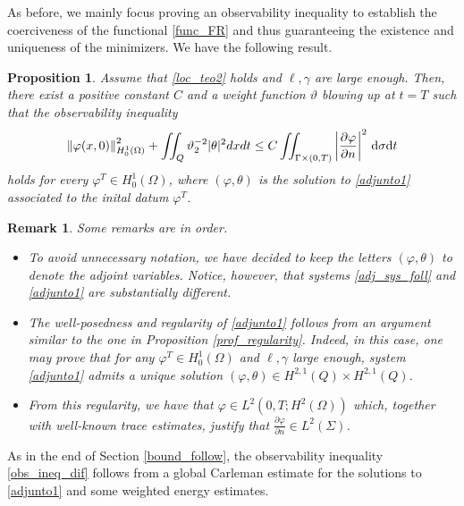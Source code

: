 \documentclass[preprint,10pt]{article}
\newtheorem{proposition}[theorem]{Proposition}
\newtheorem{remark}[theorem]{Remark}
\numberwithin{equation}{section}
\numberwithin{theorem}{section}
\def\dt{\textnormal{d}t}
\def\d{\,\textnormal{d}}
\def\cbd{\Gamma}
\def\dt{\textnormal{d}t}
\def\d{\,\textnormal{d}}
\begin{document}
{As before, we mainly focus proving an observability inequality to establish the coerciveness of the functional \eqref{func_FR} and thus guaranteeing the existence and uniqueness of the minimizers. We have the following result.
%
\begin{proposition}\label{prop_obs_ineq_dif}
Assume that \eqref{loc_teo2} holds and $\ell,\gamma$ are large enough.  Then, there exist a positive constant $C$ and a weight function $\vartheta$ blowing up at $t=T$ such that the observability inequality
%
\begin{equation}\label{obs_ineq_dif}
\left\|\varphi(x,0)\right\|^2_{H_0^1(\Omega)}+\iint_{Q}{\vartheta}_2^{-2}|\theta|^2dxdt\leq C\iint_{\cbd \times(0,T)}\left|\frac{\partial \varphi}{\partial n} \right|^2\d\sigma\dt
\end{equation}
%
holds for every $\varphi^T\in H_0^{1}(\Omega)$, where $(\varphi,\theta)$ is the solution to \eqref{adjunto1} associated to the inital datum $\varphi^T$. 
\end{proposition}
%

\begin{remark}
Some remarks are in order.
%
\begin{itemize}
\item To avoid unnecessary notation, we have decided to keep the letters $(\varphi,\theta)$ to denote the adjoint variables. Notice, however, that  systems \eqref{adj_sys_foll} and \eqref{adjunto1} are substantially different. 
\item The well-posedness and regularity of \eqref{adjunto1} follows from an argument similar to the one in Proposition \ref{prof_regularity}. Indeed, in this case, one may prove that for any $\varphi^T\in H_0^1(\Omega)$ and $\ell,\gamma$ large enough, system \eqref{adjunto1} admits a unique solution $(\varphi,\theta)\in H^{2,1}(Q)\times H^{2,1}(Q)$. 
\item From this regularity, we have that $\varphi\in L^2(0,T;H^2(\Omega))$ which, together with well-known trace estimates, justify that $\frac{\partial\varphi}{\partial n}\in L^2(\Sigma)$.
\end{itemize}
%
\end{remark}

As in the end of Section \ref{bound_follow}, the observability inequality \eqref{obs_ineq_dif} follows from a global Carleman estimate for the solutions to \eqref{adjunto1} and some weighted energy estimates. 

}
\end{document}

